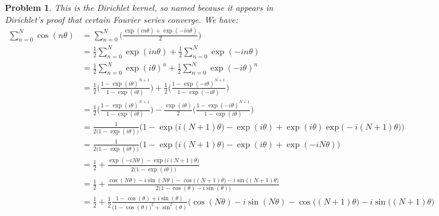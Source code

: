 \documentclass{article}
\theoremstyle{plain}
\theoremstyle{normal}
\newtheorem{problem}{Problem}[section]
\begin{document}
        \begin{problem}
            This is the Dirichlet kernel, so named because it appears in
            Dirichlet's proof that certain Fourier series converge. We have:
            \begin{align}
                \sum_{n=0}^{N}\cos(n\theta)&=
                    \sum_{n=0}^{N}\Big(
                        \frac{\exp(in\theta)+\exp(-in\theta)}{2}
                    \Big)\\
                &=\frac{1}{2}\sum_{n=0}^{N}\exp(in\theta)+
                    \frac{1}{2}\sum_{n=0}^{N}\exp(-in\theta)\\
                &=\frac{1}{2}\sum_{n=0}^{N}\exp(i\theta)^{n}+
                    \frac{1}{2}\sum_{n=0}^{N}\exp(-i\theta)^{n}\\
                &=\frac{1}{2}\Big(
                    \frac{1-\exp(i\theta)^{N+1}}{1-\exp(i\theta)}
                \Big)+\frac{1}{2}\Big(
                    \frac{1-\exp(-i\theta)^{N+1}}{1-\exp(-i\theta)}
                \Big)\\
                &=\frac{1}{2}\Big(
                    \frac{1-\exp(i\theta)^{N+1}}{1-\exp(i\theta)}
                \Big)-\frac{\exp(i\theta)}{2}\Big(
                    \frac{1-\exp(-i\theta)^{N+1}}{1-\exp(i\theta)}
                \Big)\\
                &=\frac{1}{2\big(1-\exp(i\theta)\big)}
                \Big(
                    1-\exp\big(i(N+1)\theta\big)-\exp(i\theta)
                    +\exp(i\theta)\exp\big(-i(N+1)\theta\big)
                \Big)\\
                &=\frac{1}{2\big(1-\exp(i\theta)\big)}
                \Big(
                    1-\exp\big(i(N+1)\theta\big)-\exp(i\theta)
                    +\exp(-iN\theta)
                \Big)\\
                &=\frac{1}{2}+
                \frac{\exp(-iN\theta)-\exp\big(i(N+1)\theta\big)}
                     {2\big(1-\exp(i\theta)\big)}\\
                &=\frac{1}{2}+
                    \frac{\cos(N\theta)-i\sin(N\theta)-
                          \cos\big((N+1)\theta)-i\sin\big((N+1)\theta\big)}
                         {2\big(1-\cos(\theta)-i\sin(\theta)\big)}\\
                &=\frac{1}{2}+
                    \frac{1}{2}\frac{1-\cos(\theta)+i\sin(\theta)}
                         {\big(1-\cos(\theta)\big)^{2}+\sin^{2}(\theta)}
                    \Big(\cos(N\theta)-i\sin(N\theta)-
                          \cos\big((N+1)\theta)-i\sin\big((N+1)\theta\Big)\\

\end{align}
\end{problem}
\end{document}
